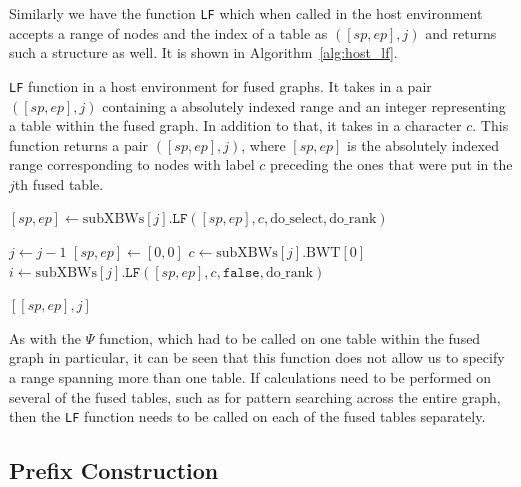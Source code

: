 \documentclass[a4paper,12pt,twoside,BCOR=10mm]{scrbook}
\begin{document}
Similarly we have the function \texttt{LF} which when called in the host environment accepts a range of nodes
and the index of a table as $ ([sp, ep], j) $ and returns such a structure as well.
It is shown in Algorithm~\ref{alg:host_lf}.
\begin{algorithm}
\caption[\texttt{LF} function in a host environment for fused graphs]{\texttt{LF} function in a host environment for fused graphs. It takes in a pair $ ([sp, ep], j) $ containing a absolutely indexed range and an integer representing a table within the fused graph. In addition to that, it takes in a character $ c $. This function returns a pair $ ([sp, ep], j) $, where $ [sp, ep] $ is the absolutely indexed range corresponding to nodes with label $ c $ preceding the ones that were put in the $ j $th fused table.}
\label{alg:host_lf}
\begin{algorithmic}[1]

\State $ [sp, ep] \gets \textrm{subXBWs}[ j ].\texttt{LF}( [sp, ep], c, \textrm{do\_select}, \textrm{do\_rank} ) $

\State \phantom{nl}

	\State $ j \gets j - 1 $
	\State $ [ sp, ep ] \gets [ 0, 0 ] $
	\State $ c \gets \textrm{subXBWs}[ j ].\textrm{BWT}[ 0 ] $
	\State $ i \gets \textrm{subXBWs}[ j ].\texttt{LF}( [sp, ep], c, \texttt{false}, \textrm{do\_rank} ) $
\EndIf

\State \phantom{nl}

\State \Return $ [ [sp, ep], j ] $

\end{algorithmic}
\end{algorithm}
As with the $\Psi$ function, which had to be called on one table within the fused graph in particular,
it can be seen that this function does not allow us to specify a range spanning more
than one table. If calculations need to be performed on
several of the fused tables, such as for pattern searching across the entire graph,
then the \texttt{LF} function needs to be called on each of the fused tables separately.

\subsection{Prefix Construction}
\end{document}
